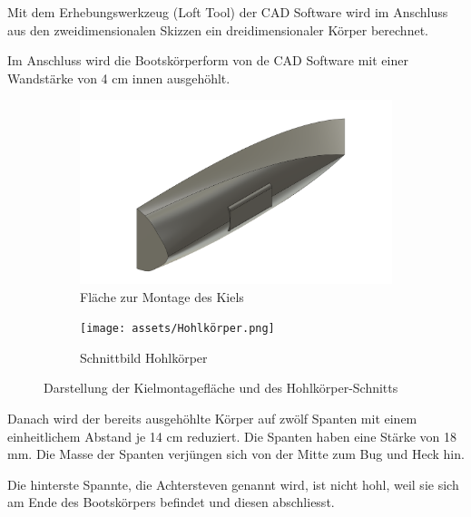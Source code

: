 Mit dem Erhebungswerkzeug (Loft Tool) der CAD Software wird im Anschluss aus den zweidimensionalen Skizzen ein dreidimensionaler Körper berechnet.

Im Anschluss wird die Bootskörperform von de CAD Software mit einer Wandstärke von 4 cm innen ausgehöhlt.

\begin{figure}[H]
    \centering
    \begin{subfigure}[b]{0.48\linewidth}
        \centering
        \includegraphics[width=\linewidth]{assets/kielbefestigung2image.png}
        \caption{Fläche zur Montage des Kiels}
        \label{fig:Kielmontage}
    \end{subfigure}
    \hfill
    \begin{subfigure}[b]{0.48\linewidth}
        \centering
        \texttt{[image: assets/Hohlkörper.png]}
        \caption{Schnittbild Hohlkörper}
        \label{fig:Hohlkoerper}
    \end{subfigure}
    \caption{Darstellung der Kielmontagefläche und des Hohlkörper-Schnitts}
    \label{fig:Kiel_und_Hohlkoerper}
\end{figure}
Danach wird der bereits ausgehöhlte Körper auf zwölf Spanten mit einem einheitlichem Abstand je 14 cm reduziert. Die Spanten haben eine Stärke von 18 mm. Die Masse der Spanten verjüngen sich von der Mitte zum Bug und Heck hin.


Die hinterste Spannte, die Achtersteven genannt wird, ist nicht hohl, weil sie sich am Ende des Bootskörpers befindet und diesen abschliesst.

